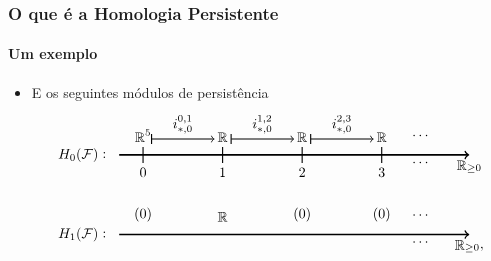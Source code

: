 \documentclass[11pt]{beamer}
\DeclareMathOperator{\R}{\mathbb{R}}
\theoremstyle{remark}
\theoremstyle{definition}
\theoremstyle{plain}
\begin{document}
    \begin{frame}
        \frametitle{O que é a Homologia Persistente}
        \framesubtitle{Um exemplo}
        \begin{itemize}
            \item
                E os seguintes módulos de persistência
                \[
                    \begin{tikzpicture}[scale=2]
                        \begin{scope}
                            \draw[->, very thick] (-0.3,0) -- (4.1,0) node[right, below]
                                {$\R_{\geq 0}$};
                            \node[left] at (-0.5,0) {$H_0(\mathcal{F})$};
                            \node[left] at (-0.4,0) {:};

                            \node[above] at (0,0.1) {$\R^5$};
                            \node[above] at (1,0.1) {$\R$};
                            \node[above] at (2,0.1) {$\R$};
                            \node[above] at (3,0.1) {$\R$};
                            \node[above] at (3.5,0.14) {$\cdots$};
                            \node[above] at (3.5,-0.2) {$\cdots$};
                            
                            \draw[-, thick] (0,0.1) --  (0,-0.1) node[below] {$0$}; 
                            \draw[-, thick] (1,0.1) --  (1,-0.1) node[below] {$1$}; 
                            \draw[-, thick] (2,0.1) --  (2,-0.1) node[below] {$2$}; 
                            \draw[-, thick] (3,0.1) --  (3,-0.1) node[below] {$3$}; 

                            \draw[ |->, thick] (0.1, 0.2) -- (0.9, 0.2) node[midway, above]
                                {$i_{\ast, 0}^{0,1}$};
                            \draw[ |->, thick] (1.1, 0.2) -- (1.9, 0.2) node[midway, above]
                                {$i_{\ast, 0}^{1,2}$};
                            \draw[ |->, thick] (2.1, 0.2) -- (2.9, 0.2) node[midway, above]
                                {$i_{\ast, 0}^{2,3}$};
                        \end{scope}
                        \begin{scope}[shift={(0,-1)}]
                            \draw[->, very thick] (-0.3,0) -- (4.1,0) node[right, below]
                                {$\R_{\geq 0},$};
                            \node[left] at (-0.5,0) {$H_1(\mathcal{F})$};
                            \node[left] at (-0.4,0) {:};

                            \node[above] at (0,0.1) {$(0)$};
                            \node[above] at (1,0.1) {$\R$};
                            \node[above] at (2,0.1) {$(0)$};
                            \node[above] at (3,0.1) {$(0)$};
                            \node[above] at (3.5,0.14) {$\cdots$};
                            \node[above] at (3.5,-0.2) {$\cdots$};
                            

\end{scope}
\end{tikzpicture}\]
\end{itemize}
\end{frame}
\end{document}

